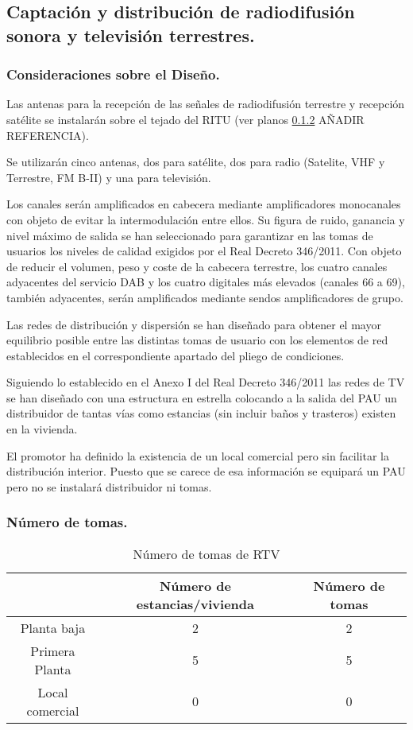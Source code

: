 \subsection{Captación y distribución de radiodifusión sonora y televisión terrestres.}

\subsubsection{Consideraciones sobre el Diseño.}


Las antenas para la recepción de las señales de radiodifusión terrestre y recepción satélite se instalarán sobre el tejado del RITU (ver planos \ref{} AÑADIR REFERENCIA).

Se utilizarán cinco antenas, dos para satélite, dos para radio (Satelite, VHF y Terrestre, FM B-II) y una para televisión.

Los canales serán amplificados en cabecera mediante amplificadores monocanales con objeto de evitar la intermodulación entre ellos. Su figura de ruido, ganancia y nivel máximo de salida se han seleccionado para garantizar en las tomas de usuarios los niveles de calidad exigidos por el Real Decreto 346/2011. Con objeto de reducir el volumen, peso y coste de la cabecera terrestre, los
cuatro canales adyacentes del servicio DAB y los cuatro digitales más elevados (canales 66 a 69), también adyacentes, serán amplificados mediante sendos amplificadores de grupo.

Las redes de distribución y dispersión se han diseñado para obtener el mayor equilibrio posible entre las distintas tomas de usuario con los elementos de red establecidos en el correspondiente apartado del pliego de condiciones.

Siguiendo lo establecido en el Anexo I del Real Decreto 346/2011 las redes de TV se han diseñado con una estructura en estrella colocando a la salida del PAU un distribuidor de tantas vías como estancias (sin incluir baños y trasteros) existen en la vivienda.

El promotor ha definido la existencia de un local comercial pero sin facilitar la distribución interior. Puesto que se carece de esa información se equipará un PAU pero no se instalará distribuidor ni tomas.

\subsubsection{Número de tomas.}

\begin{table}[H]
\caption{Número de tomas de RTV}
\label{tomasRTV}
\begin{center}
\begin{tabular}{|c|c|c|}
\hline
	 & Número de estancias/vivienda & Número de tomas\\
\hline
	Planta baja & 2 & 2\\
\hline
	Primera Planta & 5 & 5\\
\hline
    Local comercial & 0 & 0\\
\hline
\end{tabular}
\end{center}
\end{table}


